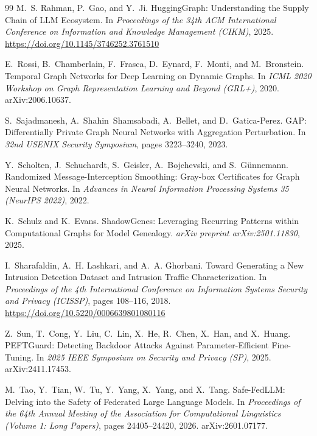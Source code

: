 \documentclass[11pt]{article}
\theoremstyle{plain}
\theoremstyle{definition}
\theoremstyle{remark}
\begin{document}
\begin{thebibliography}{99}
M.~S. Rahman, P.~Gao, and Y.~Ji.
\newblock HuggingGraph: Understanding the Supply Chain of LLM Ecosystem.
\newblock In \emph{Proceedings of the 34th ACM International Conference on Information and Knowledge Management (CIKM)}, 2025.
\newblock \url{https://doi.org/10.1145/3746252.3761510}

E.~Rossi, B.~Chamberlain, F.~Frasca, D.~Eynard, F.~Monti, and M.~Bronstein.
\newblock Temporal Graph Networks for Deep Learning on Dynamic Graphs.
\newblock In \emph{ICML 2020 Workshop on Graph Representation Learning and Beyond (GRL+)}, 2020.
\newblock arXiv:2006.10637.

S.~Sajadmanesh, A.~Shahin~Shamsabadi, A.~Bellet, and D.~Gatica-Perez.
\newblock GAP: Differentially Private Graph Neural Networks with Aggregation Perturbation.
\newblock In \emph{32nd USENIX Security Symposium}, pages 3223--3240, 2023.

Y.~Scholten, J.~Schuchardt, S.~Geisler, A.~Bojchevski, and S.~G{\"u}nnemann.
\newblock Randomized Message-Interception Smoothing: Gray-box Certificates for Graph Neural Networks.
\newblock In \emph{Advances in Neural Information Processing Systems 35 (NeurIPS 2022)}, 2022.

K.~Schulz and K.~Evans.
\newblock ShadowGenes: Leveraging Recurring Patterns within Computational Graphs for Model Genealogy.
\newblock \emph{arXiv preprint arXiv:2501.11830}, 2025.

I.~Sharafaldin, A.~H. Lashkari, and A.~A. Ghorbani.
\newblock Toward Generating a New Intrusion Detection Dataset and Intrusion Traffic Characterization.
\newblock In \emph{Proceedings of the 4th International Conference on Information Systems Security and Privacy (ICISSP)}, pages 108--116, 2018.
\newblock \url{https://doi.org/10.5220/0006639801080116}

Z.~Sun, T.~Cong, Y.~Liu, C.~Lin, X.~He, R.~Chen, X.~Han, and X.~Huang.
\newblock PEFTGuard: Detecting Backdoor Attacks Against Parameter-Efficient Fine-Tuning.
\newblock In \emph{2025 IEEE Symposium on Security and Privacy (SP)}, 2025.
\newblock arXiv:2411.17453.

M.~Tao, Y.~Tian, W.~Tu, Y.~Yang, X.~Yang, and X.~Tang.
\newblock Safe-FedLLM: Delving into the Safety of Federated Large Language Models.
\newblock In \emph{Proceedings of the 64th Annual Meeting of the Association for Computational Linguistics (Volume 1: Long Papers)}, pages 24405--24420, 2026.
\newblock arXiv:2601.07177.


\end{thebibliography}
\end{document}
